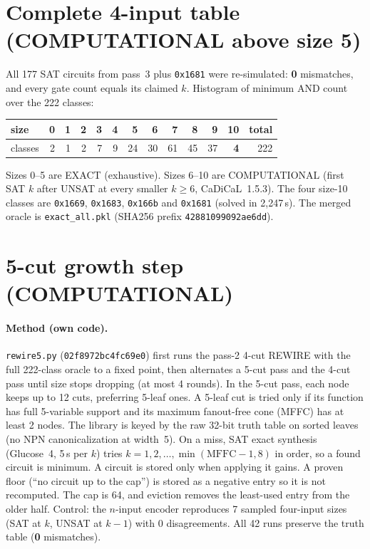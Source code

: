 \documentclass[11pt]{article}
\begin{document}
\section{Complete 4-input table (COMPUTATIONAL above size 5)}
All 177 SAT circuits from pass~3 plus \texttt{0x1681} were re-simulated: \textbf{0} mismatches, and every gate count equals its claimed $k$. Histogram of minimum AND count over the 222 classes:
\begin{center}\begin{tabular}{lrrrrrrrrrrrr}\toprule
size & 0&1&2&3&4&5&6&7&8&9&10 & total\\\midrule
classes & 2&1&2&7&9&24&30&61&45&37&\textbf{4} & 222\\\bottomrule
\end{tabular}\end{center}
Sizes 0--5 are EXACT (exhaustive). Sizes 6--10 are COMPUTATIONAL (first SAT $k$ after UNSAT at every smaller $k\ge6$, CaDiCaL~1.5.3). The four size-10 classes are \texttt{0x1669}, \texttt{0x1683}, \texttt{0x166b} and \texttt{0x1681} (solved in 2{,}247\,s). The merged oracle is \texttt{exact\_all.pkl} (SHA256 prefix \texttt{42881099092ae6dd}).

\section{5-cut growth step (COMPUTATIONAL)}
\paragraph{Method (own code).} \texttt{rewire5.py} (\texttt{02f8972bc4fc69e0}) first runs the pass-2 4-cut REWIRE with the full 222-class oracle to a fixed point, then alternates a 5-cut pass and the 4-cut pass until size stops dropping (at most 4 rounds). In the 5-cut pass, each node keeps up to 12 cuts, preferring 5-leaf ones. A 5-leaf cut is tried only if its function has full 5-variable support and its maximum fanout-free cone (MFFC) has at least 2 nodes. The library is keyed by the raw 32-bit truth table on sorted leaves (no NPN canonicalization at width~5). On a miss, SAT exact synthesis (Glucose~4, 5\,s per $k$) tries $k=1,2,\dots,\min(\mathrm{MFFC}-1,8)$ in order, so a found circuit is minimum. A circuit is stored only when applying it gains. A proven floor (``no circuit up to the cap'') is stored as a negative entry so it is not recomputed. The cap is 64, and eviction removes the least-used entry from the older half. Control: the $n$-input encoder reproduces 7 sampled four-input sizes (SAT at $k$, UNSAT at $k-1$) with 0 disagreements. All 42 runs preserve the truth table (\textbf{0} mismatches).
\end{document}
